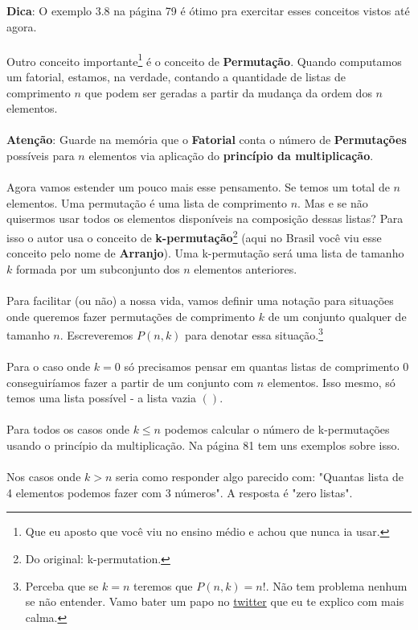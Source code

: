 \documentclass[a4paper,11pt,oneside]{book}
\theoremstyle{definition}
\theoremstyle{break}
\begin{document}
\textbf{Dica}: O exemplo 3.8 na página 79 é ótimo pra exercitar esses conceitos vistos até agora.
\\
\\
Outro conceito importante\footnote{Que eu aposto que você viu no ensino médio e achou que nunca ia usar.} é o conceito de \textbf{Permutação}. Quando computamos um fatorial, estamos, na verdade, contando a quantidade de listas de comprimento $n$ que podem ser geradas a partir da mudança da ordem dos $n$ elementos.
\\
\\
\textbf{Atenção}: Guarde na memória que o \textbf{Fatorial} conta o número de \textbf{Permutações} possíveis para $n$ elementos via aplicação do \textbf{princípio da multiplicação}.
\\
\\
Agora vamos estender um pouco mais esse pensamento. Se temos um total de $n$ elementos. Uma permutação é uma lista de comprimento $n$. Mas e se não quisermos usar todos os elementos disponíveis na composição dessas listas? Para isso o autor usa o conceito de \textbf{k-permutação}\footnote{Do original: k-permutation.} (aqui no Brasil você viu esse conceito pelo nome de \textbf{Arranjo}). Uma k-permutação será uma lista de tamanho $k$ formada por um subconjunto dos $n$ elementos anteriores.
\\
\\
Para facilitar (ou não) a nossa vida, vamos definir uma notação para situações onde queremos fazer permutações de comprimento $k$ de um conjunto qualquer de tamanho $n$. Escreveremos $P(n,k)$ para denotar essa situação.\footnote{Perceba que se $k = n$ teremos que $P(n,k) = n!$. Não tem problema nenhum se não entender. Vamo bater um papo no \href{https://twitter.com/bruno_ruas2}{twitter} que eu te explico com mais calma.} 
\\
\\
Para o caso onde $k = 0$ só precisamos pensar em quantas listas de comprimento $0$ conseguiríamos fazer a partir de um conjunto com $n$ elementos. Isso mesmo, só temos uma lista possível - a lista vazia $()$. 
\\
\\
Para todos os casos onde $k \leq n$ podemos calcular o número de k-permutações usando o princípio da multiplicação. Na página 81 tem uns exemplos sobre isso.
\\
\\
Nos casos onde $k > n$ seria como responder algo parecido com: "Quantas lista de 4 elementos podemos fazer com 3 números". A resposta é "zero listas".
\end{document}
